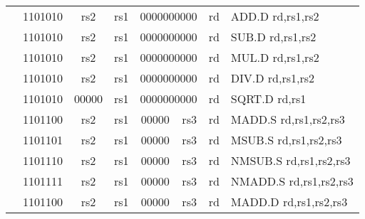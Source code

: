 \begin{table}[p]
\begin{small}
\begin{center}
\begin{tabular}{rcccccccccccl}
&
\multicolumn{2}{|c|}{1101010} &
\multicolumn{1}{c|}{rs2} &
\multicolumn{1}{c|}{rs1} &
\multicolumn{6}{c|}{0000000000} &
\multicolumn{1}{c|}{rd} & ADD.D rd,rs1,rs2 \\
\cline{2-12}
  

&
\multicolumn{2}{|c|}{1101010} &
\multicolumn{1}{c|}{rs2} &
\multicolumn{1}{c|}{rs1} &
\multicolumn{6}{c|}{0000000000} &
\multicolumn{1}{c|}{rd} & SUB.D rd,rs1,rs2 \\
\cline{2-12}
  

&
\multicolumn{2}{|c|}{1101010} &
\multicolumn{1}{c|}{rs2} &
\multicolumn{1}{c|}{rs1} &
\multicolumn{6}{c|}{0000000000} &
\multicolumn{1}{c|}{rd} & MUL.D rd,rs1,rs2 \\
\cline{2-12}
  

&
\multicolumn{2}{|c|}{1101010} &
\multicolumn{1}{c|}{rs2} &
\multicolumn{1}{c|}{rs1} &
\multicolumn{6}{c|}{0000000000} &
\multicolumn{1}{c|}{rd} & DIV.D rd,rs1,rs2 \\
\cline{2-12}
  

&
\multicolumn{2}{|c|}{1101010} &
\multicolumn{1}{c|}{00000} &
\multicolumn{1}{c|}{rs1} &
\multicolumn{6}{c|}{0000000000} &
\multicolumn{1}{c|}{rd} & SQRT.D rd,rs1 \\
\cline{2-12}
  

&
\multicolumn{2}{|c|}{1101100} &
\multicolumn{1}{c|}{rs2} &
\multicolumn{1}{c|}{rs1} &
\multicolumn{4}{c|}{00000} &
\multicolumn{2}{c|}{rs3} &
\multicolumn{1}{c|}{rd} & MADD.S rd,rs1,rs2,rs3 \\
\cline{2-12}
  

&
\multicolumn{2}{|c|}{1101101} &
\multicolumn{1}{c|}{rs2} &
\multicolumn{1}{c|}{rs1} &
\multicolumn{4}{c|}{00000} &
\multicolumn{2}{c|}{rs3} &
\multicolumn{1}{c|}{rd} & MSUB.S rd,rs1,rs2,rs3 \\
\cline{2-12}
  

&
\multicolumn{2}{|c|}{1101110} &
\multicolumn{1}{c|}{rs2} &
\multicolumn{1}{c|}{rs1} &
\multicolumn{4}{c|}{00000} &
\multicolumn{2}{c|}{rs3} &
\multicolumn{1}{c|}{rd} & NMSUB.S rd,rs1,rs2,rs3 \\
\cline{2-12}
  

&
\multicolumn{2}{|c|}{1101111} &
\multicolumn{1}{c|}{rs2} &
\multicolumn{1}{c|}{rs1} &
\multicolumn{4}{c|}{00000} &
\multicolumn{2}{c|}{rs3} &
\multicolumn{1}{c|}{rd} & NMADD.S rd,rs1,rs2,rs3 \\
\cline{2-12}
  

&
\multicolumn{2}{|c|}{1101100} &
\multicolumn{1}{c|}{rs2} &
\multicolumn{1}{c|}{rs1} &
\multicolumn{4}{c|}{00000} &
\multicolumn{2}{c|}{rs3} &
\multicolumn{1}{c|}{rd} & MADD.D rd,rs1,rs2,rs3 \\
\cline{2-12}
  


\end{tabular}
\end{center}
\end{small}
\end{table}
